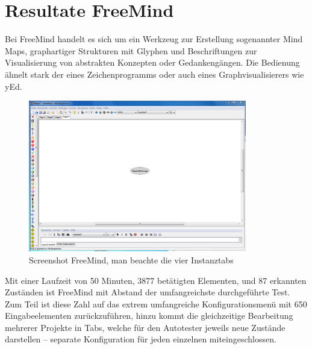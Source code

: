\section{Resultate FreeMind}\label{section:testresultsfreemind}

Bei FreeMind handelt es sich um ein Werkzeug zur Erstellung
sogenannter \glqq{}Mind Maps\grqq{}\cite{3478717310}, graphartiger
Strukturen mit Glyphen und Beschriftungen zur Visualisierung
von abstrakten Konzepten oder Gedankengängen. Die Bedienung ähnelt
stark der eines Zeichenprogramms oder auch eines Graphvisualisierers wie
yEd.


\begin{figure}
	\centering
	\includegraphics[width=0.85\textwidth]{bilder/screenshot_freemind.png}
	\caption{Screenshot FreeMind, man beachte die vier Instanztabs}
	\label{fig:screenshot_freemind}
\end{figure}


Mit einer Laufzeit von 50 Minuten, 3877 betätigten Elementen,
und 87 erkannten Zuständen ist FreeMind mit Abstand der umfangreichste
durchgeführte Test. Zum Teil ist diese Zahl auf das extrem umfangreiche
Konfigurationsmenü mit 650 Eingabeelementen zurückzuführen,
hinzu kommt die gleichzeitige Bearbeitung mehrerer Projekte in Tabs,
welche für den Autotester jeweils neue Zustände darstellen -- separate Konfiguration
für jeden einzelnen miteingeschlossen.


